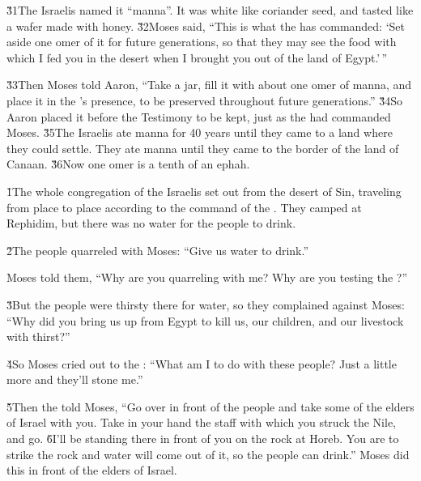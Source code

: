 \v{31}The Israelis named it ``manna''. It was white like coriander seed, and tasted like a wafer made with honey. \v{32}Moses said, ``This is what the  has commanded: `Set aside one omer of it for future generations, so that they may see the food with which I fed you in the desert when I brought you out of the land of Egypt.'\,''

\v{33}Then Moses told Aaron, ``Take a jar, fill it with about one omer of manna, and place it in the 's presence, to be preserved throughout future generations.'' \v{34}So Aaron placed it before the Testimony to be kept, just as the  had commanded Moses. \v{35}The Israelis ate manna for 40 years until they came to a land where they could settle. They ate manna until they came to the border of the land of Canaan. \v{36}Now one omer is a tenth of an ephah.

\v{1}The whole congregation of the Israelis set out from the desert of Sin, traveling from place to place according to the command of the . They camped at Rephidim, but there was no water for the people to drink.

\v{2}The people quarreled with Moses: ``Give us water to drink.''

Moses told them, ``Why are you quarreling with me? Why are you testing the ?''

\v{3}But the people were thirsty there for water, so they complained against Moses: ``Why did you bring us up from Egypt to kill us, our children, and our livestock with thirst?''

\v{4}So Moses cried out to the : ``What am I to do with these people? Just a little more and they'll stone me.''

\v{5}Then the  told Moses, ``Go over in front of the people and take some of the elders of Israel with you. Take in your hand the staff with which you struck the Nile, and go. \v{6}I'll be standing there in front of you on the rock at Horeb. You are to strike the rock and water will come out of it, so the people can drink.'' Moses did this in front of the elders of Israel.

